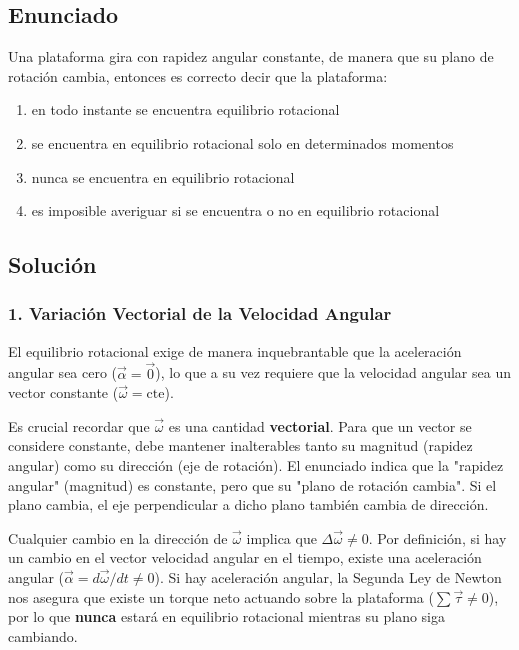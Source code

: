 \documentclass[12pt, a4paper]{article}
\begin{document}
\newpage

\subsection*{Enunciado}
Una plataforma gira con rapidez angular constante, de manera que su plano de rotación cambia, entonces es correcto decir que la plataforma:
\begin{enumerate}[label=\alph*)]
    \item en todo instante se encuentra equilibrio rotacional
    \item se encuentra en equilibrio rotacional solo en determinados momentos
    \item nunca se encuentra en equilibrio rotacional
    \item es imposible averiguar si se encuentra o no en equilibrio rotacional
\end{enumerate}

\subsection*{Solución}

\subsubsection*{1. Variación Vectorial de la Velocidad Angular}
El equilibrio rotacional exige de manera inquebrantable que la aceleración angular sea cero ($\vec{\alpha} = \vec{0}$), lo que a su vez requiere que la velocidad angular sea un vector constante ($\vec{\omega} = \text{cte}$).

Es crucial recordar que $\vec{\omega}$ es una cantidad \textbf{vectorial}. Para que un vector se considere constante, debe mantener inalterables tanto su magnitud (rapidez angular) como su dirección (eje de rotación).
El enunciado indica que la "rapidez angular" (magnitud) es constante, pero que su "plano de rotación cambia". Si el plano cambia, el eje perpendicular a dicho plano también cambia de dirección. 

Cualquier cambio en la dirección de $\vec{\omega}$ implica que $\Delta\vec{\omega} \neq 0$. Por definición, si hay un cambio en el vector velocidad angular en el tiempo, existe una aceleración angular ($\vec{\alpha} = d\vec{\omega}/dt \neq 0$). 
Si hay aceleración angular, la Segunda Ley de Newton nos asegura que existe un torque neto actuando sobre la plataforma ($\sum \vec{\tau} \neq 0$), por lo que \textbf{nunca} estará en equilibrio rotacional mientras su plano siga cambiando.
\end{document}
